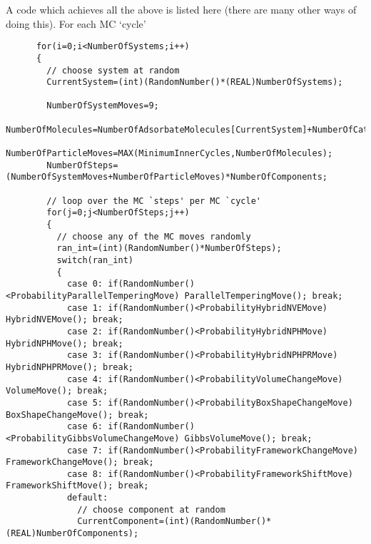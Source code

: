 \noindent A code which achieves all the above is listed here (there are many other ways of doing this). For each MC `cycle'
\begin{footnotesize}
\begin{verbatim}
      for(i=0;i<NumberOfSystems;i++)
      {
        // choose system at random
        CurrentSystem=(int)(RandomNumber()*(REAL)NumberOfSystems);

        NumberOfSystemMoves=9;
        NumberOfMolecules=NumberOfAdsorbateMolecules[CurrentSystem]+NumberOfCationMolecules[CurrentSystem];
        NumberOfParticleMoves=MAX(MinimumInnerCycles,NumberOfMolecules);
        NumberOfSteps=(NumberOfSystemMoves+NumberOfParticleMoves)*NumberOfComponents;

        // loop over the MC `steps' per MC `cycle'
        for(j=0;j<NumberOfSteps;j++)
        {
          // choose any of the MC moves randomly
          ran_int=(int)(RandomNumber()*NumberOfSteps);
          switch(ran_int)
          {
            case 0: if(RandomNumber()<ProbabilityParallelTemperingMove) ParallelTemperingMove(); break;
            case 1: if(RandomNumber()<ProbabilityHybridNVEMove) HybridNVEMove(); break;
            case 2: if(RandomNumber()<ProbabilityHybridNPHMove) HybridNPHMove(); break;
            case 3: if(RandomNumber()<ProbabilityHybridNPHPRMove) HybridNPHPRMove(); break;
            case 4: if(RandomNumber()<ProbabilityVolumeChangeMove) VolumeMove(); break;
            case 5: if(RandomNumber()<ProbabilityBoxShapeChangeMove) BoxShapeChangeMove(); break;
            case 6: if(RandomNumber()<ProbabilityGibbsVolumeChangeMove) GibbsVolumeMove(); break;
            case 7: if(RandomNumber()<ProbabilityFrameworkChangeMove) FrameworkChangeMove(); break;
            case 8: if(RandomNumber()<ProbabilityFrameworkShiftMove) FrameworkShiftMove(); break;
            default:
              // choose component at random
              CurrentComponent=(int)(RandomNumber()*(REAL)NumberOfComponents);


\end{verbatim}
\end{footnotesize}
